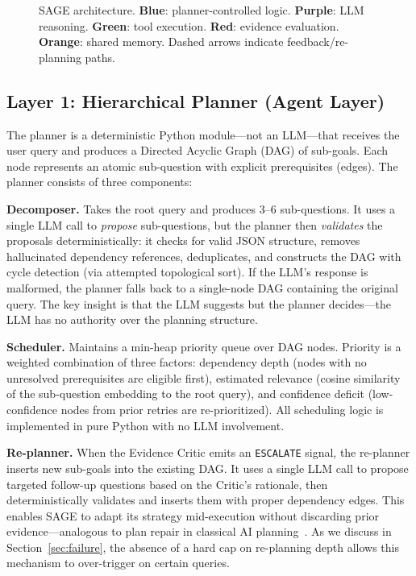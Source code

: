 \documentclass[11pt]{article}
\begin{document}
\begin{figure}[H]
\caption{SAGE architecture. \textbf{Blue}: planner-controlled logic. \textbf{Purple}: LLM reasoning. \textbf{Green}: tool execution. \textbf{Red}: evidence evaluation. \textbf{Orange}: shared memory. Dashed arrows indicate feedback/re-planning paths.}
\label{fig:arch}
\end{figure}

\subsection{Layer 1: Hierarchical Planner (Agent Layer)}

The planner is a deterministic Python module---not an LLM---that receives the user query and produces a Directed Acyclic Graph (DAG) of sub-goals. Each node represents an atomic sub-question with explicit prerequisites (edges). The planner consists of three components:

\textbf{Decomposer.} Takes the root query and produces 3--6 sub-questions. It uses a single LLM call to \emph{propose} sub-questions, but the planner then \emph{validates} the proposals deterministically: it checks for valid JSON structure, removes hallucinated dependency references, deduplicates, and constructs the DAG with cycle detection (via attempted topological sort). If the LLM's response is malformed, the planner falls back to a single-node DAG containing the original query. The key insight is that the LLM suggests but the planner decides---the LLM has no authority over the planning structure.

\textbf{Scheduler.} Maintains a min-heap priority queue over DAG nodes. Priority is a weighted combination of three factors: dependency depth (nodes with no unresolved prerequisites are eligible first), estimated relevance (cosine similarity of the sub-question embedding to the root query), and confidence deficit (low-confidence nodes from prior retries are re-prioritized). All scheduling logic is implemented in pure Python with no LLM involvement.

\textbf{Re-planner.} When the Evidence Critic emits an \texttt{ESCALATE} signal, the re-planner inserts new sub-goals into the existing DAG. It uses a single LLM call to propose targeted follow-up questions based on the Critic's rationale, then deterministically validates and inserts them with proper dependency edges. This enables SAGE to adapt its strategy mid-execution without discarding prior evidence---analogous to plan repair in classical AI planning~\cite{fox2006plan}. As we discuss in Section~\ref{sec:failure}, the absence of a hard cap on re-planning depth allows this mechanism to over-trigger on certain queries.
\end{document}
